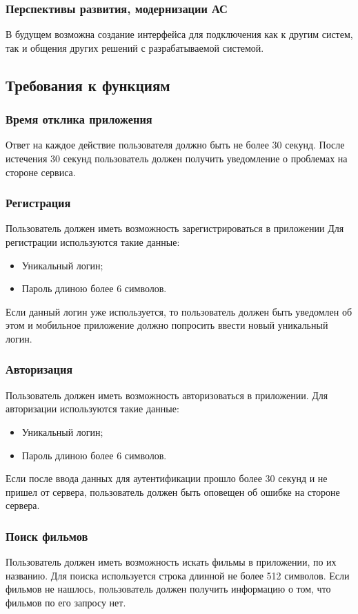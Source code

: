 \subsubsection{Перспективы развития, модернизации АС}
В будущем возможна создание интерфейса для подключения как к другим систем, так и общения других решений с
разрабатываемой системой.

\subsection{Требования к функциям}\label{subsec:func:treb}

\subsubsection{Время отклика приложения}
Ответ на каждое действие пользователя должно быть не более 30 секунд.
После истечения 30 секунд пользователь должен получить уведомление о проблемах на стороне сервиса.

\subsubsection{Регистрация}
Пользователь должен иметь возможность зарегистрироваться в приложении
Для регистрации используются такие данные:
\begin{itemize}
    \item Уникальный логин;
    \item Пароль длиною более 6 символов.
\end{itemize}
Если данный логин уже используется, то пользователь должен быть уведомлен об этом и мобильное приложение должно
попросить ввести новый уникальный логин.

\subsubsection{Авторизация}
Пользователь должен иметь возможность авторизоваться в приложении.
Для авторизации используются такие данные:
\begin{itemize}
    \item Уникальный логин;
    \item Пароль длиною более 6 символов.
\end{itemize}
Если после ввода данных для аутентификации прошло более 30 секунд и не пришел от сервера, пользователь должен быть
оповещен об ошибке на стороне сервера.

\subsubsection{Поиск фильмов}
Пользователь должен иметь возможность искать фильмы в приложении, по их названию.
Для поиска используется строка длинной не более 512 символов.
Если фильмов не нашлось, пользователь должен получить информацию о том, что фильмов по его запросу нет.

